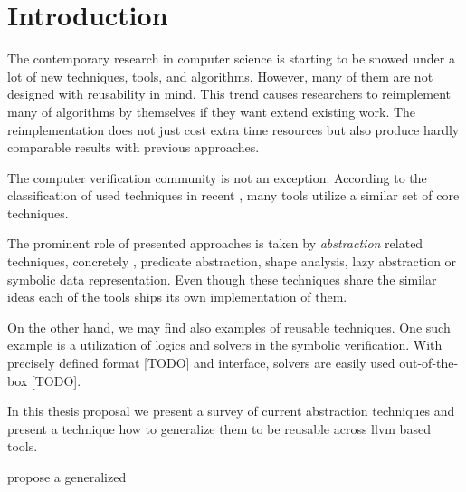 \chapter{Introduction}
\label{ch:intro}


The contemporary research in computer science is starting to be snowed under a lot of new techniques, tools, and algorithms.
However, many of them are not designed with reusability in mind.
This trend causes researchers to reimplement many of algorithms by themselves if they want extend existing work.
The reimplementation does not just cost extra time resources but also produce hardly comparable results with previous approaches.

The computer verification community is not an exception.
According to the classification of used techniques in recent \svcomp \cite{SVCOMP2019}, many tools utilize a similar set of core techniques.

The prominent role of presented approaches is taken by \emph{abstraction} related techniques, concretely \cegar, predicate abstraction, shape analysis, lazy abstraction or symbolic data representation.
Even though these techniques share the similar ideas each of the tools ships its own implementation of them.


On the other hand, we may find also examples of reusable techniques.
One such example is a utilization of \smt logics and solvers in the symbolic verification.
With precisely defined format [TODO] and interface, \smt solvers are easily used out-of-the-box [TODO].


In this thesis proposal we present a survey of current abstraction techniques and  present a technique how to generalize them to be reusable across llvm based tools.

propose a generalized


